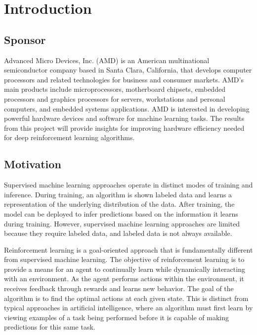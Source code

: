\chapter{Introduction}\label{Ch:Introduction}

\section{Sponsor}
Advanced Micro Devices, Inc. (AMD) is an American multinational semiconductor company based in Santa Clara, California, that develops computer processors and related technologies for business and consumer markets. AMD's main products include microprocessors, motherboard chipsets, embedded processors and graphics processors for servers, workstations and personal computers, and embedded systems applications. AMD is interested in developing powerful hardware devices and software for machine learning tasks. The results from this project will provide insights for improving hardware efficiency needed for deep reinforcement learning algorithms. 

\section{Motivation}

Supervised machine learning approaches operate in distinct modes of training and inference. During training, an algorithm is shown labeled data and learns a representation of the underlying distribution of the data. After training, the model can be deployed to infer predictions based on the information it learns during training. However, supervised machine learning approaches are limited because they require labeled data, and labeled data is not always available. 

Reinforcement learning is a goal-oriented approach that is fundamentally different from supervised machine learning. The objective of reinforcement learning is to provide a means for an agent to continually learn while dynamically interacting with an environment. As the agent performs actions within the environment, it receives feedback through rewards and learns new behavior. The goal of the algorithm is to find the optimal actions at each given state. This is distinct from typical approaches in artificial intelligence, where an algorithm must first learn by viewing examples of a task being performed before it is capable of making predictions for this same task. 

